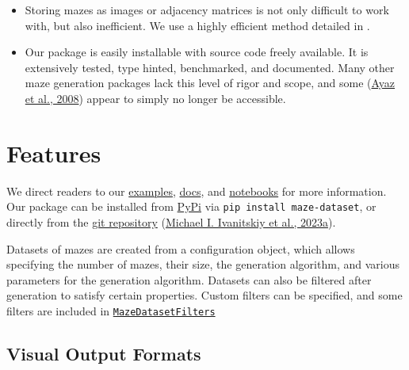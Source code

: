 \documentclass[10pt,a4paper,onecolumn]{article}
\begin{document}
\begin{itemize}
{  Ivanitskiy, n.d.}). As far as we are aware, no existing packages do
  this reliably.
\item
  Storing mazes as images or adjacency matrices is not only difficult to
  work with, but also inefficient. We use a highly efficient method
  detailed in .
\item
  Our package is easily installable with source code freely available.
  It is extensively tested, type hinted, benchmarked, and documented.
  Many other maze generation packages lack this level of rigor and
  scope, and some (\protect\hyperlink{ref-ayaz2008maze}{Ayaz et al.,
  2008}) appear to simply no longer be accessible.
\end{itemize}

\newpage

\hypertarget{features}{%
\section{Features}\label{features}}

We direct readers to our
\href{https://understanding-search.github.io/maze-dataset/examples/maze_examples.html}{examples},
\href{https://understanding-search.github.io/maze-dataset/maze_dataset.html}{docs},
and
\href{https://understanding-search.github.io/maze-dataset/notebooks/}{notebooks}
for more information. Our package can be installed from
\href{https://pypi.org/project/maze-dataset/}{PyPi} via
\texttt{pip\ install\ maze-dataset}, or directly from the
\href{https://github.com/understanding-search/maze-dataset}{git
repository} (\protect\hyperlink{ref-maze-dataset-github}{Michael I.
Ivanitskiy et al., 2023a}).

Datasets of mazes are created from a
 configuration object, which allows
specifying the number of mazes, their size, the generation algorithm,
and various parameters for the generation algorithm. Datasets can also
be filtered after generation to satisfy certain properties. Custom
filters can be specified, and some filters are included in
\href{https://understanding-search.github.io/maze-dataset/maze_dataset/dataset/filters.html\#MazeDatasetFilters}{\texttt{MazeDatasetFilters}}

\hypertarget{visual-output-formats}{%
\subsection{Visual Output Formats}\label{visual-output-formats}}
\end{document}

